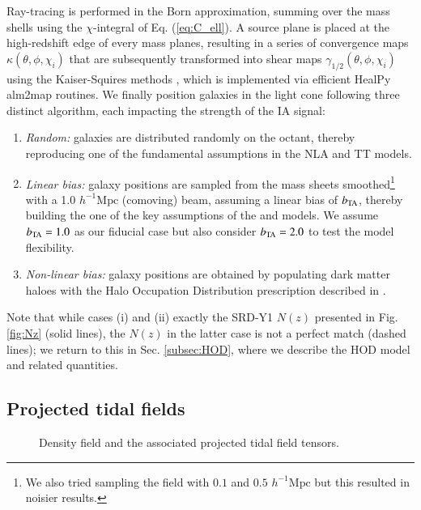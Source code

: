 Ray-tracing is performed in the Born approximation, summing over the mass shells using the $\chi$-integral of Eq. (\ref{eq:C_ell}).
A source plane is placed at the high-redshift edge of every mass planes, resulting in a series of convergence  maps $\kappa(\theta,\phi,\chi_i)$ that are subsequently transformed into shear maps $\gamma_{1/2}(\theta,\phi,\chi_i)$ using the Kaiser-Squires methods \citep{KaiserSquires}, which is implemented via efficient {\sc HealPy alm2map} routines.
We finally position galaxies in the light cone following three distinct algorithm, each impacting the strength of the IA signal:
\begin{enumerate}
\item {\it Random:} galaxies are distributed randomly on the octant, thereby reproducing one of the  fundamental assumptions in the NLA and TT models. 
\item {\it Linear bias:} galaxy positions are sampled from the mass sheets smoothed\footnote{We also tried sampling the field with $0.1$ and $0.5$ $h^{-1}\mathrm{Mpc}$ but this resulted in noisier results.} with a 1.0 $h^{-1}\mathrm{Mpc}$ (comoving) beam, assuming a linear bias of $b_{\rm TA}$, thereby building the one of the key assumptions of the \dNLA and \dTT models. 
We assume $b_{\rm TA}=1.0$ as our fiducial case but also consider $b_{\rm TA}=2.0$ to test  the  model flexibility. 
\item{\it Non-linear bias:} galaxy positions are obtained by populating dark matter haloes with the Halo Occupation Distribution prescription described in \citet{cosmoDC2}. 
\end{enumerate}
Note that while cases (i) and (ii) exactly the SRD-Y1 $N(z)$ presented in Fig. \ref{fig:Nz} (solid lines), the $N(z)$ in the latter case is not a perfect match (dashed lines); we return to this in Sec. \ref{subsec:HOD}, where we describe the HOD model and related quantities.  


\subsection{Projected tidal fields}
\label{subsec:IA_sims}

\begin{figure*}
\caption{Density field and the associated projected tidal field tensors.}
\label{fig:maps}
\end{figure*}


